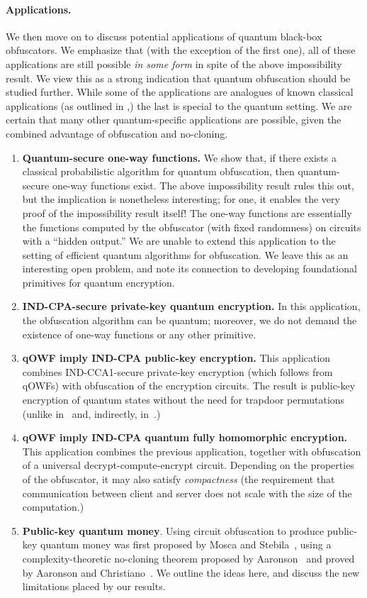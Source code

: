 \documentclass[envcountsame]{llncs}
\numberwithin{equation}{section}
\begin{document}
\paragraph{Applications.} We then move on to discuss potential applications of quantum black-box obfuscators. We emphasize that (with the exception of the first one), all of these applications are still possible \emph{in some form} in spite of the above impossibility result. We view this as a strong indication that quantum obfuscation should be studied further. While some of the applications are analogues of known classical applications (as outlined in \cite{BGIRSVY12},) the last is special to the quantum setting. We are certain that many other quantum-specific applications are possible, given the combined advantage of obfuscation and no-cloning.

\begin{enumerate}
\item \textbf{Quantum-secure one-way functions.} We show that, if there exists a classical probabilistic algorithm for quantum obfuscation, then quantum-secure one-way functions exist. The above impossibility result rules this out, but the implication is nonetheless interesting; for one, it enables the very proof of the impossibility result itself! The one-way functions are essentially the functions computed by the obfuscator (with fixed randomness) on circuits with a ``hidden output.'' We are unable to extend this application to the setting of efficient quantum algorithms for obfuscation. We leave this as an interesting open problem, and note its connection to developing foundational primitives for quantum encryption.
\item \textbf{IND-CPA-secure private-key quantum encryption.} In this application, the obfuscation algorithm can be quantum; moreover, we do not demand the existence of one-way functions or any other primitive.
\item \textbf{qOWF imply IND-CPA public-key encryption.} This application combines IND-CCA1-secure private-key encryption (which follows from qOWFs) with obfuscation of the encryption circuits. The result is public-key encryption of quantum states without the need for trapdoor permutations (unlike in~\cite{ABFGSS16} and, indirectly, in~\cite{BJ15}.)
\item \textbf{qOWF imply IND-CPA quantum fully homomorphic encryption.} This application combines the previous application, together with obfuscation of a universal decrypt-compute-encrypt circuit. Depending on the properties of the obfuscator, it may also satisfy \emph{compactness} (the requirement that communication between client and server does not scale with the size of the computation.)
\item \textbf{Public-key quantum money}. Using circuit obfuscation to produce public-key quantum money was first proposed by Mosca and Stebila~\cite{MS10}, using a complexity-theoretic no-cloning theorem proposed by Aaronson~\cite{Aar09} and proved by Aaronson and Christiano~\cite{AC12}. We outline the ideas here, and discuss the new limitations placed by our results.
\end{enumerate}
\end{document}
